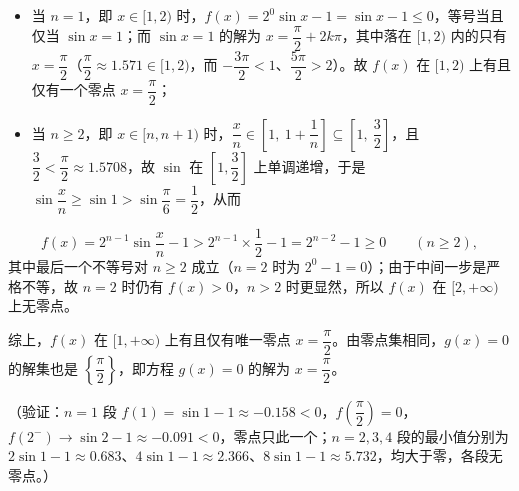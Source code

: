 \begin{answer}
\begin{itemize}
\item 当 \(n=1\)，即 \(x\in[1,2)\) 时，\(f(x)=2^{0}\sin x-1=\sin x-1\leqslant0\)，等号当且仅当 \(\sin x=1\)；而 \(\sin x=1\) 的解为 \(x=\dfrac{\pi}{2}+2k\pi\)，其中落在 \([1,2)\) 内的只有 \(x=\dfrac{\pi}{2}\)（\(\dfrac{\pi}{2}\approx1.571\in[1,2)\)，而 \(-\dfrac{3\pi}{2}<1\)、\(\dfrac{5\pi}{2}>2\)）。故 \(f(x)\) 在 \([1,2)\) 上有且仅有一个零点 \(x=\dfrac{\pi}{2}\)；
\item 当 \(n\geqslant2\)，即 \(x\in[n,n+1)\) 时，\(\dfrac{x}{n}\in\left[1,\ 1+\dfrac{1}{n}\right]\subseteq\left[1,\ \dfrac{3}{2}\right]\)，且 \(\dfrac{3}{2}<\dfrac{\pi}{2}\approx1.5708\)，故 \(\sin\) 在 \(\left[1,\dfrac{3}{2}\right]\) 上单调递增，于是 \(\sin\dfrac{x}{n}\geqslant\sin1>\sin\dfrac{\pi}{6}=\dfrac{1}{2}\)，从而
\end{itemize}
\nopagebreak[4]
\[
f(x)=2^{n-1}\sin\frac{x}{n}-1>2^{n-1}\times\frac{1}{2}-1=2^{n-2}-1\geqslant0\qquad(n\geqslant2),
\]
其中最后一个不等号对 \(n\geqslant2\) 成立（\(n=2\) 时为 \(2^{0}-1=0\)）；由于中间一步是严格不等，故 \(n=2\) 时仍有 \(f(x)>0\)，\(n>2\) 时更显然，所以 \(f(x)\) 在 \([2,+\infty)\) 上无零点。

综上，\(f(x)\) 在 \([1,+\infty)\) 上有且仅有唯一零点 \(x=\dfrac{\pi}{2}\)。由零点集相同，\(g(x)=0\) 的解集也是 \(\left\{\dfrac{\pi}{2}\right\}\)，即方程 \(g(x)=0\) 的解为 \(x=\dfrac{\pi}{2}\)。

（验证：\(n=1\) 段 \(f(1)=\sin1-1\approx-0.158<0\)，\(f\left(\dfrac{\pi}{2}\right)=0\)，\(f(2^{-})\to\sin2-1\approx-0.091<0\)，零点只此一个；\(n=2,3,4\) 段的最小值分别为 \(2\sin1-1\approx0.683\)、\(4\sin1-1\approx2.366\)、\(8\sin1-1\approx5.732\)，均大于零，各段无零点。）



\end{answer}